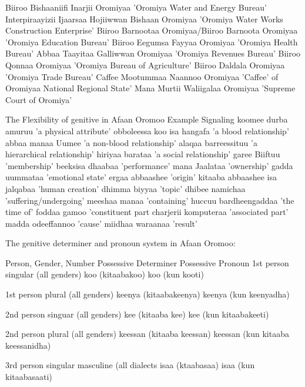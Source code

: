 \documentclass[11pt,a4paper]{article}
\begin{document}
	Biiroo Bishaaniifi Inarjii Oromiyaa 'Oromiya Water and Energy Bureau'	
	Interpiraayizii Ijaarsaa Hojiiwwan Bishaan Oromiyaa 'Oromiya Water Works Construction Enterprise'	
	Biiroo Barnootaa Oromiyaa/Biiroo Barnoota Oromiyaa 'Oromiya Education Bureau'
	Biiroo Eegumsa Fayyaa Oromiyaa 'Oromiya Health Bureau'
	Abbaa Taayitaa Galliwwan Oromiyaa 'Oromiya Revenues Bureau'
	Biiroo Qonnaa Oromiyaa 'Oromiya Bureau of Agriculture'
	Biiroo Daldala Oromiyaa 'Oromiya Trade Bureau'
	Caffee Mootummaa Naannoo Oromiyaa 'Caffee' of Oromiyaa National Regional State'
	Mana Murtii Waliigalaa Oromiyaa 'Supreme Court of Oromiya'
	
	
	The Flexibility of genitive in Afaan Oromoo
	Example                           Signaling
	koomee durba amuruu               'a physical attribute'
	obboleessa koo isa hangafa        'a blood relationship'
	abbaa manaa Uumee                'a non-blood relationship'
	alaqaa barreessituu              'a hierarchical relationship'
	hiriyaa barataa                  'a social relationship'
	garee Biiftuu                    'membership'
	beeksisa dhaabaa                 'performance'
	mana Jaalataa                    'ownership'
	gadda uummataa                   'emotional state'
	ergaa abbaashee                  'origin'
	kitaaba abbaashee isa jalqabaa   'human creation'
	dhimma biyyaa                   'topic'
	dhibee namichaa                'suffering/undergoing'
	meeshaa manaa                  'containing'
	huccuu bardheengaddaa          'the time of'
	foddaa gamoo                   'constituent part
	charjerii komputeraa           'associated part'
	madda odeeffannoo              'cause'
	miidhaa waraanaa               'result'
	
	
	The genitive determiner and pronoun system in Afaan Oromoo:
	
	Person, Gender, Number           Possessive Determiner             Possessive Pronoun
	1st person singular
	(all genders)                    koo (kitaabakoo)                       koo (kun kooti)
	
	1st person plural
	(all genders)                    keenya (kitaabakeenya)                keenya (kun keenyadha)
	
	2nd person singuar
	(all genders)                   kee (kitaaba kee)                     kee (kun  kitaabakeeti)
	
	2nd person plural
	(all genders)                  keessan (kitaaba keessan)              keessan (kun kitaaba keessanidha)
	
	3rd person singular
	masculine
	(all dialects                 isaa (ktaabasaa)                        isaa (kun kitaabasaati)
	
\end{document}

